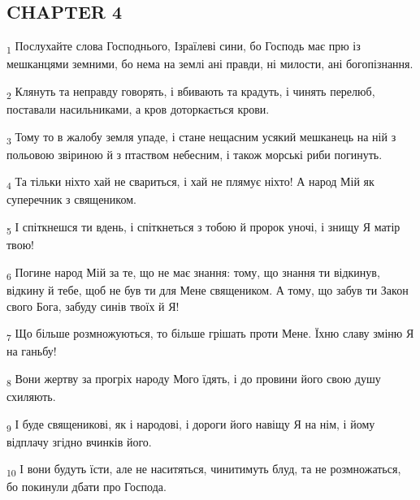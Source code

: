 \subsection{CHAPTER 4}
\begin{tcolorbox}
\textsubscript{1} Послухайте слова Господнього, Ізраїлеві сини, бо Господь має прю із мешканцями земними, бо нема на землі ані правди, ні милости, ані богопізнання.
\end{tcolorbox}
\begin{tcolorbox}
\textsubscript{2} Клянуть та неправду говорять, і вбивають та крадуть, і чинять перелюб, поставали насильниками, а кров доторкається крови.
\end{tcolorbox}
\begin{tcolorbox}
\textsubscript{3} Тому то в жалобу земля упаде, і стане нещасним усякий мешканець на ній з польовою звіриною й з птаством небесним, і також морські риби погинуть.
\end{tcolorbox}
\begin{tcolorbox}
\textsubscript{4} Та тільки ніхто хай не свариться, і хай не плямує ніхто! А народ Мій як суперечник з священиком.
\end{tcolorbox}
\begin{tcolorbox}
\textsubscript{5} І спіткнешся ти вдень, і спіткнеться з тобою й пророк уночі, і знищу Я матір твою!
\end{tcolorbox}
\begin{tcolorbox}
\textsubscript{6} Погине народ Мій за те, що не має знання: тому, що знання ти відкинув, відкину й тебе, щоб не був ти для Мене священиком. А тому, що забув ти Закон свого Бога, забуду синів твоїх й Я!
\end{tcolorbox}
\begin{tcolorbox}
\textsubscript{7} Що більше розмножуються, то більше грішать проти Мене. Їхню славу зміню Я на ганьбу!
\end{tcolorbox}
\begin{tcolorbox}
\textsubscript{8} Вони жертву за прогріх народу Мого їдять, і до провини його свою душу схиляють.
\end{tcolorbox}
\begin{tcolorbox}
\textsubscript{9} І буде священикові, як і народові, і дороги його навіщу Я на нім, і йому відплачу згідно вчинків його.
\end{tcolorbox}
\begin{tcolorbox}
\textsubscript{10} І вони будуть їсти, але не наситяться, чинитимуть блуд, та не розмножаться, бо покинули дбати про Господа.
\end{tcolorbox}
